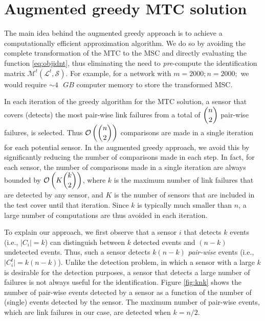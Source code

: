 \documentclass[twocolumn]{autart}
\begin{document}
\section{Augmented greedy MTC solution}
\label{sec:New_Algo}\vspace{-0.35cm}
The main idea behind the augmented greedy approach is to achieve a computationally efficient approximation algorithm. We do so by avoiding the complete transformation of the MTC to the MSC and directly evaluating the function \eqref{eq:objidnt}, thus eliminating the need to \textit{pre}-compute the identification matrix $\mathcal{M}^t(\mathcal{L}^t,\mathcal{S})$. For example, for a network with $m = 2000; n = 2000;$ we would require $\sim 4 \text{ } GB$ computer memory to store the transformed MSC. \vspace{-0.25cm}

In each iteration of the greedy algorithm for the MTC solution, a sensor that covers (detects) the most pair-wise link failures from a total of $\dbinom{n}{2}$ pair-wise failures, is selected. Thus $\mathcal{O}\left(\dbinom{n}{2}\right)$ comparisons are made in a single iteration for each potential sensor. In the augmented greedy approach, we avoid this by significantly reducing the number of comparisons made in each step. In fact, for each sensor, the number of comparisons made in a single iteration are always bounded by $\mathcal{O}\left(K\dbinom{k}{2}\right)$, where $k$ is the maximum number of link failures that are detected by any sensor, and $K$ is the number of sensors that are included in the test cover until that iteration. Since $k$ is typically much smaller than $n$, a large number of computations are thus avoided in each iteration.  \vspace{-0.25cm}

To explain our approach, we first observe that a sensor $i$ that detects $k$ events (i.e., $\lvert C_i \rvert = k$) can distinguish between $k$ detected events and $(n-k)$ undetected events. Thus, such a sensor detects $k(n-k)$ \textit{pair-wise} events (i.e., $\lvert C^t_i \rvert = k(n-k)$). Unlike the detection problem, in which a sensor with a large $k$ is desirable for the detection purposes, a sensor that detects a large number of failures is not always useful for the identification.
Figure \ref{fig:knk} shows the number of pair-wise events detected by a sensor as a function of the number of (single) events detected by the sensor. The maximum number of pair-wise events, which are link failures in our case, are detected when $k=n/2$. 
\end{document}
